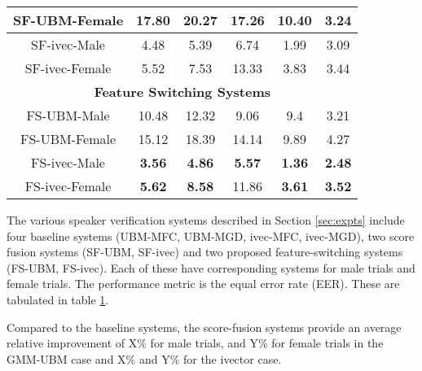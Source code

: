 \documentclass{article}
\begin{document}
\begin{table}[h]
\begin{tabular}{|c|c|c|c|c|c|}
SF-UBM-Female & 17.80 & 20.27 & 17.26 & 10.40 & 3.24 \\ 
\hline

SF-ivec-Male & 4.48 & 5.39 & 6.74 & 1.99 & 3.09 \\ 
\hline

SF-ivec-Female & 5.52 & 7.53 & 13.33 & 3.83 & 3.44 \\ 
 \hline

\multicolumn{6}{|c|}{\bf Feature Switching Systems} \\ \hline

{FS-UBM-Male} & {10.48} & {12.32} & {9.06} & {9.4} & {3.21} \\  \hline

{FS-UBM-Female} & {15.12 } & {18.39} & {14.14} & {9.89} & {4.27} \\ \hline

 {FS-ivec-Male} & {\bf 3.56} & {\bf 4.86} & {\bf 5.57} & {\bf 1.36} & {\bf 2.48} \\ \hline

{FS-ivec-Female} & {\bf 5.62} & {\bf 8.58} & 11.86 & {\bf 3.61} & {\bf 3.52} \\ \hline

	\end{tabular}
	\label{tab:eer}
	\end{table}


The various speaker verification systems described in Section \ref{sec:expts} 
include four baseline systems (UBM-MFC, UBM-MGD, ivec-MFC, ivec-MGD), two score 
fusion systems (SF-UBM, SF-ivec) and two proposed feature-switching systems 
(FS-UBM, FS-ivec). Each of these have corresponding systems for male trials and 
female trials. The performance metric is the equal error rate (EER). These are 
tabulated in table \ref{tab:eer}.


Compared to the baseline systems, the score-fusion systems provide an average
relative improvement of X\% for male trials, and Y\% for female trials in the
GMM-UBM case and X\% and Y\% for the ivector case. 
\end{document}
